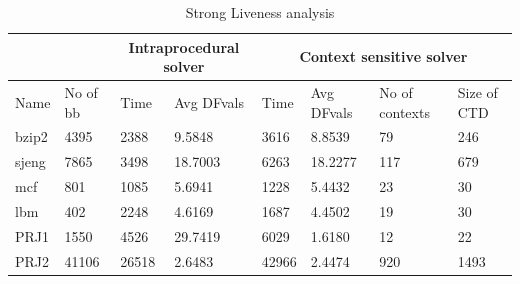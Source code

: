 \documentclass[12pt]{report}
\begin{document}
\begin {table}[H]
\label{tab:slive} 
\begin{flushleft}
\begin{tabular}{|l | l | l | p{2.3cm} | l | p{2.3cm} | p{1.4cm} | p{1.2cm} | }
  \hline                        
  \multicolumn{2}{|c|}{} &
  \multicolumn{2}{|c|}{Intraprocedural solver} &
  \multicolumn{4}{|c|}{Context sensitive solver} \\
  \hline
  Name & No of bb & Time & Avg DFvals &  Time  & Avg DFvals    & No of \newline contexts  & Size of \newline CTD \\  \hline  
  bzip2& 4395     & 2388 &  9.5848    & 3616   & 8.8539        & 79                       & 246                  \\ \hline  
  sjeng& 7865     & 3498 &  18.7003   & 6263   & 18.2277       & 117                      & 679                  \\  \hline  
  mcf  & 801      & 1085 &  5.6941    & 1228   & 5.4432        & 23                       & 30                   \\  \hline
  lbm  & 402      & 2248 &  4.6169    & 1687   & 4.4502        & 19                       & 30                   \\  \hline
  PRJ1 & 1550     & 4526 &  29.7419   & 6029   & 1.6180        & 12                       & 22                   \\  \hline
  PRJ2 & 41106    & 26518&  2.6483    & 42966  & 2.4474        & 920                      & 1493                 \\  \hline  
\end{tabular}
\end{flushleft}
\caption {Strong Liveness analysis}
\end {table}
\end{document}

